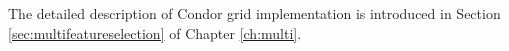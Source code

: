 The detailed description of Condor grid implementation is introduced in \mbox{Section} \ref{sec:multifeatureselection} of \mbox{Chapter} \ref{ch:multi}.


